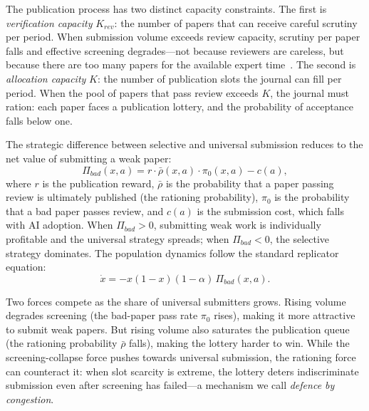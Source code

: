 \documentclass{article}
\begin{document}
The publication process has two distinct capacity constraints.
The first is \emph{verification capacity} $K_{rev}$: the number of papers that can receive careful scrutiny per period.
When submission volume exceeds review capacity, scrutiny per paper falls and effective screening degrades---not because reviewers are careless, but because there are too many papers for the available expert time~\citep{Bianchi2018, Kovanis2016}.
The second is \emph{allocation capacity} $K$: the number of publication slots the journal can fill per period.
When the pool of papers that pass review exceeds $K$, the journal must ration: each paper faces a publication lottery, and the probability of acceptance falls below one.

The strategic difference between selective and universal submission reduces to the net value of submitting a weak paper:
\begin{equation}
    \Pi_{bad}(x,a) = r \cdot \bar{\rho}(x,a) \cdot \pi_0(x,a) - c(a),
    \label{eq:pibad}
\end{equation}
where $r$ is the publication reward, $\bar{\rho}$ is the probability that a paper passing review is ultimately published (the rationing probability), $\pi_0$ is the probability that a bad paper passes review, and $c(a)$ is the submission cost, which falls with AI adoption.
When $\Pi_{bad} > 0$, submitting weak work is individually profitable and the universal strategy spreads; when $\Pi_{bad} < 0$, the selective strategy dominates.
The population dynamics follow the standard replicator equation:
\begin{equation}
    \dot{x} = -x(1-x)(1-\alpha)\,\Pi_{bad}(x,a).
    \label{eq:replicator}
\end{equation}

Two forces compete as the share of universal submitters grows.
Rising volume degrades screening (the bad-paper pass rate $\pi_0$ rises), making it more attractive to submit weak papers.
But rising volume also saturates the publication queue (the rationing probability $\bar{\rho}$ falls), making the lottery harder to win.
While the screening-collapse force pushes towards universal submission, the rationing force can counteract it: when slot scarcity is extreme, the lottery deters indiscriminate submission even after screening has failed---a mechanism we call \emph{defence by congestion}.
\end{document}
